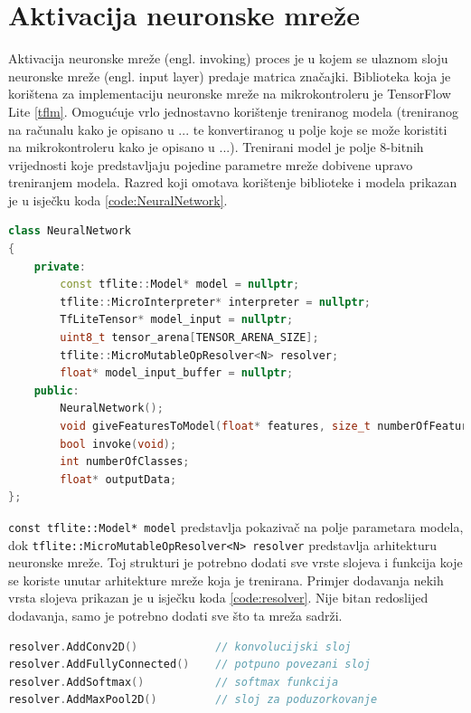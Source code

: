 \section{Aktivacija neuronske mreže}
\label{sec:activation}

Aktivacija neuronske mreže (engl. invoking) proces je u kojem se ulaznom sloju neuronske mreže 
(engl. input layer) predaje matrica značajki. Biblioteka koja je korištena za implementaciju
neuronske mreže na mikrokontroleru je TensorFlow Lite \ref{tflm}. Omogućuje vrlo jednostavno
korištenje treniranog modela (treniranog na računalu kako je opisano u ... te konvertiranog
u polje koje se može koristiti na mikrokontroleru kako je opisano u ...). Trenirani model
je polje 8-bitnih vrijednosti koje predstavljaju pojedine parametre mreže dobivene upravo 
treniranjem modela. Razred koji omotava korištenje biblioteke i modela prikazan je 
u isječku koda \ref{code:NeuralNetwork}. 

\begin{lstlisting}[language=C++, caption=Razred neuronske mreže, label=code:NeuralNetwork]
class NeuralNetwork
{
    private:
        const tflite::Model* model = nullptr;
        tflite::MicroInterpreter* interpreter = nullptr;
        TfLiteTensor* model_input = nullptr;
        uint8_t tensor_arena[TENSOR_ARENA_SIZE];
        tflite::MicroMutableOpResolver<N> resolver;
        float* model_input_buffer = nullptr;
    public:
        NeuralNetwork();
        void giveFeaturesToModel(float* features, size_t numberOfFeatures);
        bool invoke(void);
        int numberOfClasses;
        float* outputData;  
};   
\end{lstlisting}

\texttt{const tflite::Model* model} predstavlja 
pokazivač na polje parametara modela, dok \texttt{tflite::MicroMutableOpResolver<N> resolver}
predstavlja arhitekturu neuronske mreže. Toj strukturi je potrebno dodati sve vrste slojeva 
i funkcija koje se koriste unutar arhitekture mreže koja je trenirana. Primjer dodavanja 
nekih vrsta slojeva prikazan je u isječku koda \ref{code:resolver}. Nije bitan redoslijed 
dodavanja, samo je potrebno dodati sve što ta mreža sadrži.

\begin{lstlisting}[language=C++, caption=Gradnja arhitekture mreže, label=code:resolver]
resolver.AddConv2D()            // konvolucijski sloj
resolver.AddFullyConnected()    // potpuno povezani sloj
resolver.AddSoftmax()           // softmax funkcija
resolver.AddMaxPool2D()         // sloj za poduzorkovanje
\end{lstlisting}

